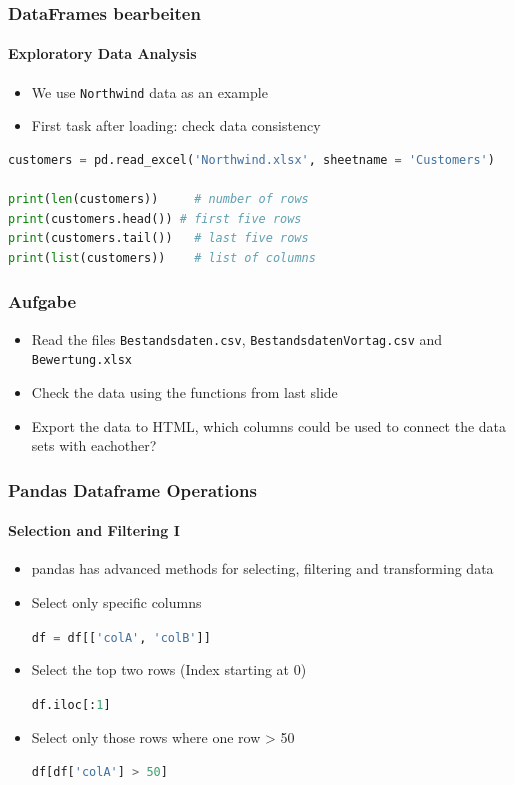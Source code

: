 \documentclass[ngerman]{beamer}
\begin{document}
\begin{frame}[fragile]
\frametitle{DataFrames bearbeiten}
\framesubtitle{Exploratory Data Analysis}

\begin{itemize}
	\item We use \texttt{Northwind} data as an example
	\item First task after loading: check data consistency
\end{itemize}

\begin{lstlisting}[language={Python}]
customers = pd.read_excel('Northwind.xlsx', sheetname = 'Customers')

print(len(customers))     # number of rows
print(customers.head()) # first five rows
print(customers.tail())   # last five rows
print(list(customers))    # list of columns
\end{lstlisting}
\end{frame}


\begin{frame}
\frametitle{Aufgabe}


\begin{itemize}
\item Read the files \texttt{Bestandsdaten.csv}, \texttt{Bestandsdaten\textunderscore Vortag.csv}  and \texttt{Bewertung.xlsx} 
\item Check the data using the functions from last slide
\item Export the data to HTML, which columns could be used to connect the data sets with eachother?
\end{itemize}
\end{frame}

\begin{frame}[fragile]
\frametitle{Pandas Dataframe Operations}
\framesubtitle{Selection and Filtering I}

\begin{itemize}
	\item pandas has advanced methods for selecting, filtering and transforming data 
\item Select only specific columns

\lstinline[language={Python}]{df = df[['colA', 'colB']]}

\item Select the top two rows (Index starting at 0)

\lstinline[language={Python}]{df.iloc[:1]}

\item Select only those rows where one row > 50

\lstinline[language={Python}]{df[df['colA'] > 50]}
\end{itemize}
\end{frame}
\end{document}

